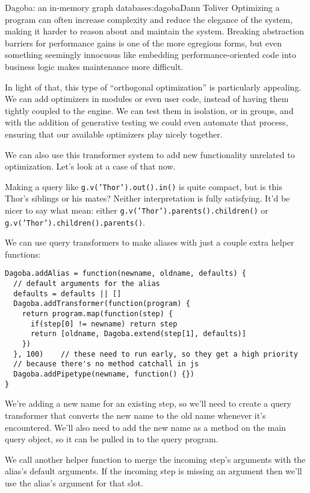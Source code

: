 \begin{aosachapter}{Dagoba: an in-memory graph database}{s:dagoba}{Dann Toliver}
Optimizing a program can often increase complexity and reduce the
elegance of the system, making it harder to reason about and maintain
the system. Breaking abstraction barriers for performance gains is one
of the more egregious forms, but even something seemingly innocuous like
embedding performance-oriented code into business logic makes
maintenance more difficult.

In light of that, this type of ``orthogonal optimization'' is
particularly appealing. We can add optimizers in modules or even user
code, instead of having them tightly coupled to the engine. We can test
them in isolation, or in groups, and with the addition of generative
testing we could even automate that process, ensuring that our available
optimizers play nicely together.

We can also use this transformer system to add new functionality
unrelated to optimization. Let's look at a case of that now.

\label{aliases}

Making a query like \texttt{g.v('Thor').out().in()} is quite compact,
but is this Thor's siblings or his mates? Neither interpretation is
fully satisfying. It'd be nicer to say what mean: either
\texttt{g.v('Thor').parents().children()} or
\texttt{g.v('Thor').children().parents()}.

We can use query transformers to make aliases with just a couple extra
helper functions:

\begin{verbatim}
Dagoba.addAlias = function(newname, oldname, defaults) {
  // default arguments for the alias
  defaults = defaults || []                             
  Dagoba.addTransformer(function(program) {
    return program.map(function(step) {
      if(step[0] != newname) return step
      return [oldname, Dagoba.extend(step[1], defaults)]
    })
  }, 100)    // these need to run early, so they get a high priority
  // because there's no method catchall in js
  Dagoba.addPipetype(newname, function() {})            
}
\end{verbatim}

We're adding a new name for an existing step, so we'll need to create a
query transformer that converts the new name to the old name whenever
it's encountered. We'll also need to add the new name as a method on the
main query object, so it can be pulled in to the query program.

We call another helper function to merge the incoming step's arguments
with the alias's default arguments. If the incoming step is missing an
argument then we'll use the alias's argument for that slot.


\end{aosachapter}
